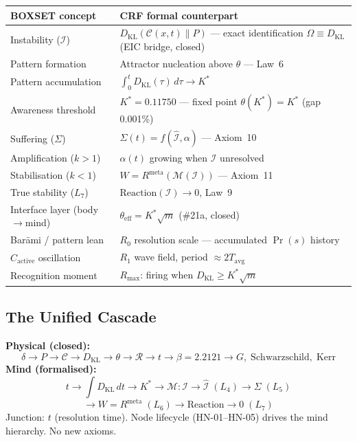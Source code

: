 \documentclass[12pt, a4paper]{article}
\begin{document}
\begin{center}
\renewcommand{\arraystretch}{1.3}
\begin{tabular}{p{3.5cm} p{8.5cm}}
\toprule
\textbf{BOXSET concept} & \textbf{CRF formal counterpart} \\
\midrule
Instability ($\mathcal{I}$) & $D_{\mathrm{KL}}(\mathcal{C}(x,t)\|P)$ --- exact identification $\Omega\equiv D_{\mathrm{KL}}$ (EIC bridge, closed) \\
Pattern formation & Attractor nucleation above $\theta$ --- Law~6 \\
Pattern accumulation & $\int_0^t D_{\mathrm{KL}}(\tau)\,d\tau \to K^*$ \\
Awareness threshold & $K^* = 0.11750$ --- fixed point $\theta(K^*) = K^*$ (gap 0.001\%) \\
Suffering ($\Sigma$) & $\Sigma(t) = f(\hat{\mathcal{I}},\alpha)$ --- Axiom~10 \\
Amplification ($k>1$) & $\alpha(t)$ growing when $\mathcal{I}$ unresolved \\
Stabilisation ($k<1$) & $W = R^{\mathrm{meta}}(\mathcal{M}(\mathcal{I}))$ --- Axiom~11 \\
True stability ($L_7$) & $\mathrm{Reaction}(\mathcal{I})\to 0$, Law~9 \\
Interface layer (body$\to$mind) & $\theta_{\mathrm{eff}} = K^*\sqrt{m}$ (\#21a, closed) \\
Bar\={a}mi / pattern lean & $R_0$ resolution scale --- accumulated $\Pr(s)$ history \\
$C_{\mathrm{active}}$ oscillation & $R_1$ wave field, period $\approx 2T_{\mathrm{avg}}$ \\
Recognition moment & $R_{\max}$: firing when $D_{\mathrm{KL}} \geq K^*\sqrt{m}$ \\
\bottomrule
\end{tabular}
\end{center}

\subsection{The Unified Cascade}

\begin{keybox}[title={Physical + Mind Segment: One Unbroken Chain}]
\textbf{Physical (closed):}
{\small\[
  \delta \to P \to \mathcal{C} \to D_{\mathrm{KL}} \to \theta \to \mathcal{R} \to t
  \to \beta = 2.2121 \to G,\;\text{Schwarzschild},\;\text{Kerr}
\]}
\textbf{Mind (formalised):}
{\small\[
  t \to \textstyle\int D_{\mathrm{KL}}\,dt \to K^*
  \to \mathcal{M}:\mathcal{I}\to\hat{\mathcal{I}}\;(L_4)
  \to \Sigma\;(L_5)
\]}
{\small\[
  \to W = R^{\mathrm{meta}}\;(L_6)
  \to \mathrm{Reaction}\to 0\;(L_7)
\]}
Junction: $t$ (resolution time). Node lifecycle (HN-01--HN-05) drives the mind hierarchy.
No new axioms.
\end{keybox}
\end{document}
